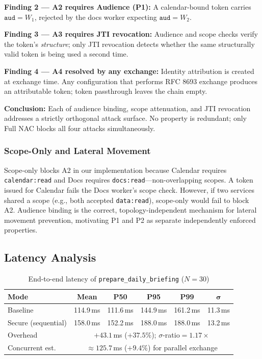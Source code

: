 \documentclass[journal]{IEEEtran}
\begin{document}
\textbf{Finding 2 — A2 requires Audience (P1):} A calendar-bound token carries
$\texttt{aud}=W_1$, rejected by the docs worker expecting $\texttt{aud}=W_2$.

\textbf{Finding 3 — A3 requires JTI revocation:} Audience and scope checks
verify the token's \textit{structure}; only JTI revocation detects whether the
same structurally valid token is being used a second time.

\textbf{Finding 4 — A4 resolved by any exchange:} Identity attribution is
created at exchange time. Any configuration that performs RFC 8693 exchange
produces an attributable token; token passthrough leaves the chain empty.

\textbf{Conclusion:} Each of audience binding, scope attenuation, and JTI
revocation addresses a strictly orthogonal attack surface. No property is
redundant; only Full NAC blocks all four attacks simultaneously.

\subsubsection{Scope-Only and Lateral Movement}
\label{sec:scope_caveat}
Scope-only blocks A2 in our implementation because Calendar requires
\texttt{calendar:read} and Docs requires \texttt{docs:read}---non-overlapping
scopes. A token issued for Calendar fails the Docs worker's scope check.
However, if two services shared a scope (e.g., both accepted \texttt{data:read}),
scope-only would fail to block A2. Audience binding is the correct,
topology-independent mechanism for lateral movement prevention, motivating P1
and P2 as separate independently enforced properties.

\subsection{Latency Analysis}

\begin{table}[h]
\caption{End-to-end latency of \texttt{prepare\_daily\_briefing} ($N=30$)}
\label{tab:latency}
\centering
\footnotesize
\begin{tabular}{lccccc}
\toprule
\textbf{Mode} & \textbf{Mean} & \textbf{P50} & \textbf{P95} & \textbf{P99}
              & $\boldsymbol\sigma$ \\
\midrule
Baseline            & 114.9\,ms & 111.6\,ms & 144.9\,ms & 161.2\,ms & 11.3\,ms \\
Secure (sequential) & 158.0\,ms & 152.2\,ms & 188.0\,ms & 188.0\,ms & 13.2\,ms \\
\midrule
Overhead
  & \multicolumn{5}{c}{$+43.1$\,ms ($+37.5\%$);\;
    $\sigma$-ratio\;$=1.17{\times}$} \\
Concurrent est.
  & \multicolumn{5}{c}{$\approx 125.7$\,ms ($+9.4\%$) for parallel exchange} \\
\bottomrule
\end{tabular}
\end{table}
\end{document}
